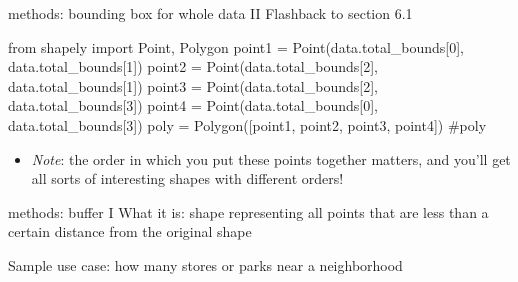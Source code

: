 \documentclass[
  ignorenonframetext,
]{beamer}
\newenvironment{Shaded}{\begin{snugshade}}{\end{snugshade}}
\newcommand{\CommentTok}[1]{\textcolor[rgb]{0.37,0.37,0.37}{#1}}
\newcommand{\DecValTok}[1]{\textcolor[rgb]{0.68,0.00,0.00}{#1}}
\newcommand{\ImportTok}[1]{\textcolor[rgb]{0.00,0.46,0.62}{#1}}
\newcommand{\NormalTok}[1]{\textcolor[rgb]{0.00,0.23,0.31}{#1}}
\newcommand{\OperatorTok}[1]{\textcolor[rgb]{0.37,0.37,0.37}{#1}}
\providecommand{\tightlist}{%
  \setlength{\itemsep}{0pt}\setlength{\parskip}{0pt}}\usepackage{longtable,booktabs,array}
\begin{document}
\begin{frame}[fragile]{methods: bounding box for whole data II}
\label{methods-bounding-box-for-whole-data-ii}
Flashback to section 6.1

\begin{Shaded}
\begin{Highlighting}[]
\ImportTok{from}\NormalTok{ shapely }\ImportTok{import}\NormalTok{ Point, Polygon}
\NormalTok{point1 }\OperatorTok{=}\NormalTok{ Point(data.total\_bounds[}\DecValTok{0}\NormalTok{], data.total\_bounds[}\DecValTok{1}\NormalTok{])}
\NormalTok{point2 }\OperatorTok{=}\NormalTok{ Point(data.total\_bounds[}\DecValTok{2}\NormalTok{], data.total\_bounds[}\DecValTok{1}\NormalTok{])}
\NormalTok{point3 }\OperatorTok{=}\NormalTok{ Point(data.total\_bounds[}\DecValTok{2}\NormalTok{], data.total\_bounds[}\DecValTok{3}\NormalTok{])}
\NormalTok{point4 }\OperatorTok{=}\NormalTok{ Point(data.total\_bounds[}\DecValTok{0}\NormalTok{], data.total\_bounds[}\DecValTok{3}\NormalTok{])}
\NormalTok{poly }\OperatorTok{=}\NormalTok{ Polygon([point1, point2, point3, point4])}
\CommentTok{\#poly}
\end{Highlighting}
\end{Shaded}

\begin{itemize}
\tightlist
\item
  \emph{Note}: the order in which you put these points together matters,
  and you'll get all sorts of interesting shapes with different orders!
\end{itemize}
\end{frame}

\begin{frame}{methods: buffer I}
\label{methods-buffer-i}
What it is: shape representing all points that are less than a certain
distance from the original shape

Sample use case: how many stores or parks near a neighborhood
\end{frame}
\end{document}
